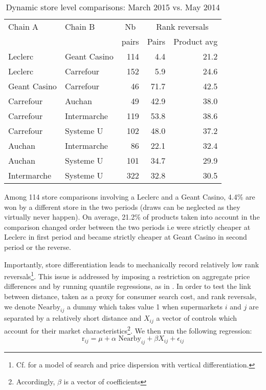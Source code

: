 \documentclass[english]{article}
\begin{document}
\begin{table}
\caption{Dynamic store level comparisons: March 2015 vs. May 2014}
\label{tab:dynamic_compa_15km}
\begin{threeparttable}
\begin{tabular}{llr|rr}
    \toprule
    \toprule
    Chain A & Chain B & \multicolumn{1}{c|}{Nb} & \multicolumn{2}{c}{Rank reversals} \\
          &       & \multicolumn{1}{c|}{pairs} & \multicolumn{1}{c}{Pairs} & \multicolumn{1}{c}{Product avg} \\
    \midrule
    Leclerc & Geant Casino & 114   & 4.4   & 21.2 \\
    Leclerc & Carrefour & 152   & 5.9   & 24.6 \\
    Geant Casino & Carrefour & 46    & 71.7  & 42.5 \\
    Carrefour & Auchan & 49    & 42.9  & 38.0 \\
    Carrefour & Intermarche & 119   & 53.8  & 38.6 \\
    Carrefour & Systeme U & 102   & 48.0  & 37.2 \\
    Auchan & Intermarche & 86    & 22.1  & 32.4 \\
    Auchan & Systeme U & 101   & 34.7  & 29.9 \\
    Intermarche & Systeme U & 322   & 32.8  & 30.5 \\
    \bottomrule
    \bottomrule
\end{tabular}
\begin{tablenotes}
      \small
      \item Among 114 store comparisons involving a Leclerc and a Geant Casino, 4.4\% are won by a different store in the two periods (draws can be neglected as they virtually never happen). On average, 21.2\% of products taken into account in the comparison changed order between the two periods i.e were strictly cheaper at Leclerc in first period and became strictly cheaper at Geant Casino in second period or the reverse.
\end{tablenotes}
\end{threeparttable}
\end{table}

Importantly, store differentiation leads to mechanically record relatively low rank reversals\footnote{Cf. \cite{WIL11} for a model of search and price dispersion with vertical differentiation.}. This issue is addressed by imposing a restriction on aggregate price differences and by running quantile regressions, as in \cite{CHA11}. In order to test the link between distance, taken as a proxy for consumer search cost, and rank reversals, we denote $\text{Nearby}_{ij}$ a dummy which takes value 1 when supermarkets $i$ and $j$ are separated by a relatively short distance and $X_{ij}$ a vector of controls which account for their market characteristics\footnote{Accordingly, $\beta$ is a vector of coefficients}. We then run the following regression:
\begin{equation}
\text{r}_{ij}= \mu + \alpha {\text{ Nearby}_{ij}} + \beta X_{ij} + \epsilon_{ij}
\end{equation}
\end{document}
